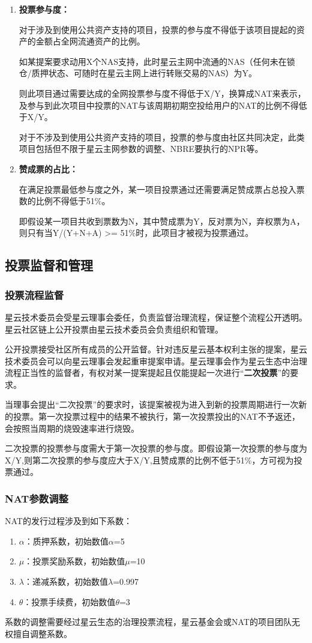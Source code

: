 \begin{enumerate}
	\item 

	\textbf{投票参与度：}

	对于涉及到使用公共资产支持的项目，投票的参与度不得低于该项目提起的资产的金额占全网流通资产的比例。

	如某提案要求动用X个NAS支持，此时星云主网中流通的NAS（任何未在锁仓/质押状态、可随时在星云主网上进行转账交易的NAS）为Y。

	则此项目通过需要达成的全网投票参与度不得低于X/Y，换算成NAT来表示，及参与到此次项目中投票的NAT与该周期初期空投给用户的NAT的比例不得低于X/Y。

	对于不涉及到使用公共资产支持的项目，投票的参与度由社区共同决定，此类项目包括但不限于星云主网参数的调整、NBRE要执行的NPR等。

	\item

	\textbf{赞成票的占比：}

	在满足投票最低参与度之外，某一项目投票通过还需要满足赞成票占总投入票数的比例不得低于51\%。

	即假设某一项目共收到票数为N，其中赞成票为Y，反对票为N，弃权票为A，则只有当Y/(Y+N+A) >= 51\%时，此项目才被视为投票通过。
\end{enumerate}

\subsection{投票监督和管理}

\subsubsection{投票流程监督}
\label{second-vote}

星云技术委员会受星云理事会委任，负责监督治理流程，保证整个流程公开透明。星云社区链上公开投票由星云技术委员会负责组织和管理。

公开投票接受社区所有成员的公开监督。针对违反星云基本权利主张的提案，星云技术委员会可以向星云理事会发起重审提案申请。星云理事会作为星云生态中治理流程正当性的监督者，有权对某一提案提起且仅能提起一次进行“\textbf{二次投票}”的要求。

当理事会提出“二次投票”的要求时，该提案被视为进入到新的投票周期进行一次新的投票。第一次投票过程中的结果不被执行，第一次投票投出的NAT不予返还，会按照当周期的烧毁速率进行烧毁。

二次投票的投票参与度需大于第一次投票的参与度。即假设第一次投票的参与度为X/Y,则第二次投票的参与度应大于X/Y,且赞成票的比例不低于51\%，方可视为投票通过。

\subsubsection{NAT参数调整}

NAT的发行过程涉及到如下系数：

\begin{enumerate}
	\item $\alpha$：质押系数，初始数值$\alpha$=5
	\item $\mu$：投票奖励系数，初始数值$\mu$=10
	\item $\lambda$：递减系数，初始数值$\lambda$=0.997
	\item $\theta$：投票手续费，初始数值$\theta$=3
\end{enumerate}

系数的调整需要经过星云生态的治理投票流程，星云基金会或NAT的项目团队无权擅自调整系数。




